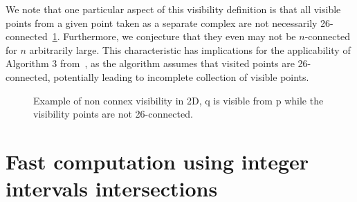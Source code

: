 \documentclass[runningheads]{llncs}
\begin{document}
    We note that one particular aspect of this visibility definition is that all visible points from a given point taken as a separate complex are not necessarily 26-connected~\ref{fig:visibility-2d-not-connected}.
    Furthermore, we conjecture that they even may not be $n$-connected for $n$ arbitrarily large.
    This characteristic has implications for the applicability of Algorithm 3 from~\cite{lachaud:2022-jmiv}, as the algorithm assumes that visited points are 26-connected, potentially leading to incomplete collection of visible points.

    \begin{figure}
        \centering
        \caption{Example of non connex visibility in 2D, q is visible from p while the visibility points are not 26-connected.}
        \label{fig:visibility-2d-not-connected}
    \end{figure}




    \section{Fast computation using integer intervals intersections}
\end{document}
